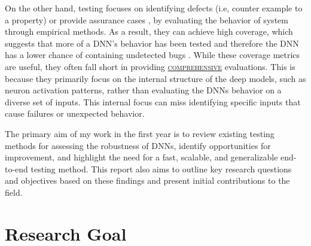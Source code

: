 On the other hand, testing focuses on identifying defects (i.e, counter example to a property) or provide assurance cases \cite {Rushby}, by evaluating the behavior of system through empirical methods. As a result, they can achieve high coverage, which suggests that more of a DNN's behavior has been tested and therefore the DNN has a lower chance of containing undetected bugs \cite{HuangX}. While these coverage metrics are useful, they often fall short in providing \hyperref[gloss]{\textsc{comprehensive}}\label{comprehensive} evaluations. This is because they primarily focus on the internal structure of the deep models, such as neuron activation patterns, rather than evaluating the DNNs behavior on a diverse set of inputs. This internal focus can miss identifying specific inputs that cause failures or unexpected behavior.


\begin{tcolorbox}[colback=purple!2!white, colframe=purple,title= 10\textsuperscript{th} Month Report Goal]

    The primary aim of my work in the first year is to review existing testing methods for assessing the robustness of DNNs, identify opportunities for improvement, and highlight the need for a fast, scalable, and generalizable end-to-end testing method. This report also aims to outline key research questions and objectives based on these findings and present initial contributions to the field.

\end{tcolorbox}
    



\section{Research Goal}

